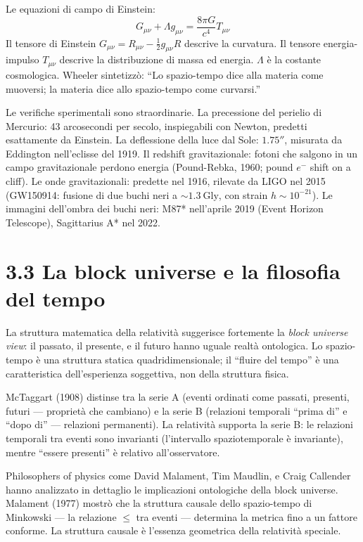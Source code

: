 \documentclass[11.5pt,a4paper,openany]{book}
\theoremstyle{remark}
\begin{document}
Le equazioni di campo di Einstein:
\[
G_{\mu\nu} + \Lambda g_{\mu\nu} = \frac{8\pi G}{c^4} T_{\mu\nu}
\]
Il tensore di Einstein $G_{\mu\nu} = R_{\mu\nu} - \frac{1}{2}g_{\mu\nu}R$ descrive la curvatura. Il tensore energia-impulso $T_{\mu\nu}$ descrive la distribuzione di massa ed energia. $\Lambda$ è la costante cosmologica. Wheeler sintetizzò: ``Lo spazio-tempo dice alla materia come muoversi; la materia dice allo spazio-tempo come curvarsi.''

Le verifiche sperimentali sono straordinarie. La precessione del perielio di Mercurio: 43 arcosecondi per secolo, inspiegabili con Newton, predetti esattamente da Einstein. La deflessione della luce dal Sole: $1.75''$, misurata da Eddington nell'eclisse del 1919. Il redshift gravitazionale: fotoni che salgono in un campo gravitazionale perdono energia (Pound-Rebka, 1960; pound $e^-$ shift on a cliff). Le onde gravitazionali: predette nel 1916, rilevate da LIGO nel 2015 (GW150914: fusione di due buchi neri a $\sim 1.3\ \text{Gly}$, con strain $h \sim 10^{-21}$). Le immagini dell'ombra dei buchi neri: M87* nell'aprile 2019 (Event Horizon Telescope), Sagittarius A* nel 2022.

\section{3.3 La block universe e la filosofia del tempo}

La struttura matematica della relatività suggerisce fortemente la \textit{block universe view}: il passato, il presente, e il futuro hanno uguale realtà ontologica. Lo spazio-tempo è una struttura statica quadridimensionale; il ``fluire del tempo'' è una caratteristica dell'esperienza soggettiva, non della struttura fisica.

McTaggart (1908) distinse tra la serie A (eventi ordinati come passati, presenti, futuri --- proprietà che cambiano) e la serie B (relazioni temporali ``prima di'' e ``dopo di'' --- relazioni permanenti). La relatività supporta la serie B: le relazioni temporali tra eventi sono invarianti (l'intervallo spaziotemporale è invariante), mentre ``essere presenti'' è relativo all'osservatore.

Philosophers of physics come David Malament, Tim Maudlin, e Craig Callender hanno analizzato in dettaglio le implicazioni ontologiche della block universe. Malament (1977) mostrò che la struttura causale dello spazio-tempo di Minkowski --- la relazione $\leq$ tra eventi --- determina la metrica fino a un fattore conforme. La struttura causale è l'essenza geometrica della relatività speciale.
\end{document}
